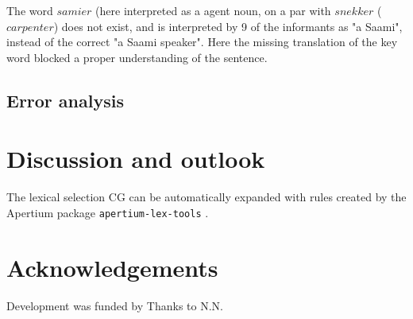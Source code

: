 The word $samier$ (here interpreted as a agent noun, on a par with $snekker$ ($carpenter$) does not exist, and is interpreted by 9 of the informants as "a Saami", instead of the correct "a Saami speaker". Here the missing translation of the key word blocked a proper understanding of the sentence.




\subsection{Error analysis}


\section{Discussion and outlook}


The lexical selection CG can be automatically expanded with rules
created by the Apertium package \texttt{apertium-lex-tools}
\citep{???}.

\section*{Acknowledgements}
Development was funded by 
Thanks to N.N.


\nocite{zubizarreta2009amt}
